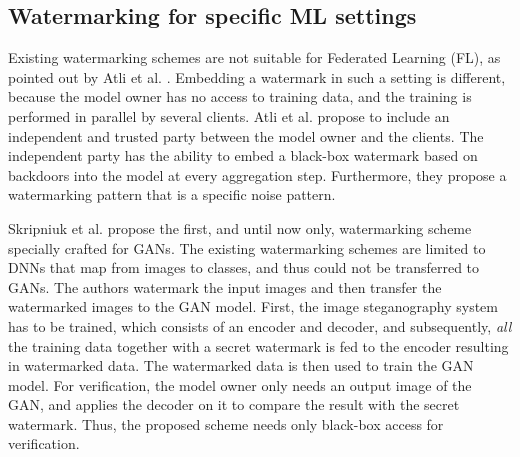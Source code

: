 \subsection{Watermarking for specific ML settings}


Existing watermarking schemes are not suitable for Federated Learning (FL), as pointed out by Atli et al. \cite{atli_waffle_2020}. Embedding a watermark in such a setting is different, because the model owner has no access to training data, and the training is performed in parallel by several clients.
Atli et al. %
propose to include an independent and trusted party between the model owner and the clients. The independent party has the ability to embed a black-box watermark based on backdoors into the model at every aggregation step.
Furthermore, they propose a watermarking pattern that is a specific noise pattern.

Skripniuk et al. \cite{skripniuk_black-box_2020} propose the first, and until now only, watermarking scheme specially crafted for GANs. The existing watermarking schemes are limited to DNNs that map from images to classes, and thus could not be transferred to GANs. The authors watermark the input images and then transfer the watermarked images to the GAN model. First, the image steganography system has to be trained, which consists of an encoder and decoder,
and subsequently, \textit{all} the training data together with a secret watermark is fed to the encoder resulting in watermarked data. The watermarked data is then used to train the GAN model. For verification, the model owner only needs an output image of the GAN, and applies the decoder on it to compare the result with the secret watermark. Thus, the proposed scheme needs only black-box access for verification.

